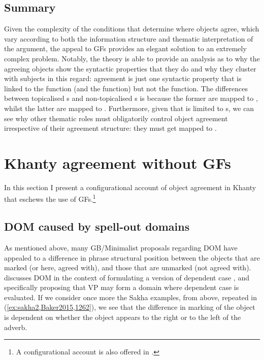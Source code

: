\documentclass[output=paper
,modfonts
,nonflat]{langsci/langscibook}
\begin{document}
\subsection{Summary}

Given the complexity of the conditions that determine where objects agree,\linebreak
which vary according to both the information structure and thematic interpretation of the argument, the appeal to GFs provides an elegant solution to an extremely complex problem.  
Notably, the theory is able to provide an analysis as to why the agreeing objects show the syntactic properties that they do and why they cluster with subjects in this regard: agreement is just one syntactic property that is linked to the \object{} function (and the \subj{} function) but not the \robj{} function.
The differences between topicalised \theme s and non-topicalised \theme s is because the former are mapped to \object, whilst the latter are mapped to \robj.
Furthermore, given that \robj{} is limited to \theme s, we can see why other thematic roles must obligatorily control object agreement irrespective of their agreement structure: they must get mapped to \object.

\section{Khanty agreement without GFs}\label{reanalysis}

In this section I present a configurational account of object agreement in Khanty that eschews the use of GFs.\footnote{A configurational account is also offered in \citet{barany2016b}.}

\subsection{DOM caused by spell-out domains}

As mentioned above, many GB/Minimalist proposals regarding DOM have appealed to a difference in phrase structural position between the objects that are marked (or here, agreed with), and those that are unmarked (not agreed with).
\citet{Baker2015} discusses DOM in the context of formulating a version of dependent case \citep{Marantz1991}, and specifically proposing that VP may form a domain where dependent case is evaluated. 
If we consider once more the Sakha examples, from above, repeated in (\ref{ex:sakha2,Baker2015,1262}), we see that the difference in marking of the object is dependent on whether the object appears to the right or to the left of the adverb.
\end{document}
